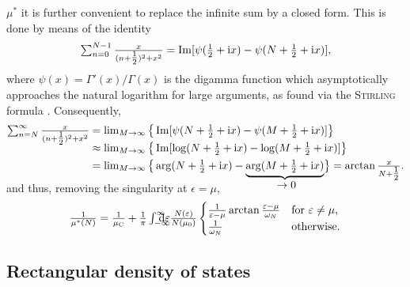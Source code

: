 $\mu^*$ it is further convenient to replace the infinite sum by a closed form.
This is done by means of the identity \cite[Eq.~A.14]{AllenMitrovic82}
%
\begin{equation*}
    \sum_{n = 0}^{N - 1} \frac x {(n + \tfrac 1 2)^2 + x^2}
    = \Im[\psi(\tfrac 1 2 + \I x) - \psi(N + \tfrac 1 2 + \I x)],
\end{equation*}
%
where $\psi(x) = \varGamma'(x) / \varGamma(x)$ is the digamma function which
asymptotically approaches the natural logarithm for large arguments, as found
via the \textsc{Stirling} formula \cite[Appendix~A]{AllenMitrovic82}.
Consequently,
%
\begin{align*}
    \smash[b]{\sum_{n = N}^\infty \frac x {(n + \tfrac 1 2)^2 + x^2}}
    &= \lim_{M \rightarrow \infty}
    \big\{
        \Im[\psi(N + \tfrac 1 2 + \I x) - \psi(M + \tfrac 1 2 + \I x)]
    \big\}
    \\
    &\approx \lim_{M \rightarrow \infty}
    \big\{
        \Im[\log(N + \tfrac 1 2 + \I x) - \log(M + \tfrac 1 2 + \I x)]
    \big\}
    \\
    &= \lim_{M \rightarrow \infty}
    \big\{
        \arg(N + \tfrac 1 2 + \I x) - \smash[b]
        {\hypo{\arg(M + \tfrac 1 2 + \I x)}{\rightarrow 0}}
    \big\}
    = \smash{\arctan \frac x {N + \tfrac 1 2}}.
\end{align*}
%
and thus, removing the singularity at $\epsilon = \mu$,
%
\begin{equation*}
    \frac 1 {\mu^*(N)} = \frac 1 {\mu \sub C}
    + \frac 1 \pi \int \from{-\infty} \till \infty \D \epsilon
    \frac{N(\epsilon)}{N(\mu_0)}
    \begin{cases}
        \frac 1 {\epsilon - \mu} \arctan \frac{\epsilon - \mu}{\omega_N}
            & \text{for $\epsilon \neq \mu$,} \\
        \frac 1 {\omega_N}
            & \text{otherwise.}
    \end{cases}
\end{equation*}

\subsection{Rectangular density of states}
\label{rectangular density of states}

